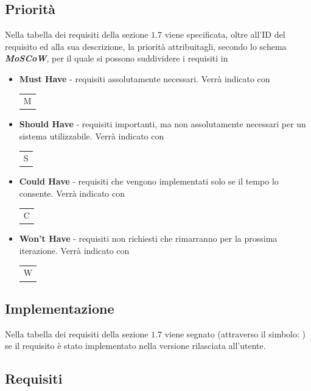 \documentclass{article}
\begin{document}
\subsection{Priorità}
Nella tabella dei requisiti della sezione $1.7$ viene specificata, oltre all'ID del requisito ed alla sua descrizione, la priorità attribuitagli, secondo lo schema \textit{\textbf{{MoSCoW}}}, per il quale si possono suddividere i requisiti in 
\begin{itemize}
    \item \textbf{Must Have} - requisiti assolutamente necessari. Verrà indicato con \hspace{.1cm} \begin{tabular}{c}
    \rowcolor{Green}
         M  \\ 
    \end{tabular}
    \item \textbf{Should Have} - requisiti importanti, ma non assolutamente necessari per un sistema utilizzabile. Verrà indicato con \hspace{.1cm} \begin{tabular}{c}
    \rowcolor{LimeGreen}
         S  \\ 
    \end{tabular}
    \item \textbf{Could Have} - requisiti che vengono implementati solo se il tempo lo consente. Verrà indicato con \hspace{.1cm} \begin{tabular}{c}
    \rowcolor{RedOrange}
         C  \\ 
    \end{tabular}
    \item \textbf{Won't Have} - requisiti non richiesti che rimarranno per la prossima iterazione. Verrà indicato con \hspace{.1cm} \begin{tabular}{c}
    \rowcolor{BrickRed}
         W  \\ 
    \end{tabular}
\end{itemize}

\subsection{Implementazione}
Nella tabella dei requisiti della sezione $1.7$ viene segnato (attraverso il simbolo: \checkmark) se il requisito è stato implementato nella versione rilasciata all'utente.

\subsection{Requisiti}
\end{document}
